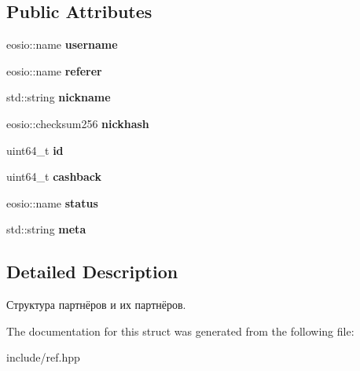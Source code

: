 \subsection*{Public Attributes}
\begin{DoxyCompactItemize}
\item 
\mbox{\label{structpartners2_a7b279bce1d671ae29aa0d9b14936204b}} 
eosio\+::name {\bfseries username}
\item 
\mbox{\label{structpartners2_a6198ca816832f4fcb8b6211c9e88f7b1}} 
eosio\+::name {\bfseries referer}
\item 
\mbox{\label{structpartners2_adb751d90a64a4b19f0aab7e61f792f25}} 
std\+::string {\bfseries nickname}
\item 
\mbox{\label{structpartners2_aadb1fde1e890fa68678cba34acb50b82}} 
eosio\+::checksum256 {\bfseries nickhash}
\item 
\mbox{\label{structpartners2_a8902d55d8abeecef589daabb3c0e85e5}} 
uint64\+\_\+t {\bfseries id}
\item 
\mbox{\label{structpartners2_af916875cf91b9cd8534f0cbe84317a6c}} 
uint64\+\_\+t {\bfseries cashback}
\item 
\mbox{\label{structpartners2_aa9d5cb6acaacac876169c5f3efddcf1e}} 
eosio\+::name {\bfseries status}
\item 
\mbox{\label{structpartners2_a8189bf00e09ffc820b76f99acd7b337a}} 
std\+::string {\bfseries meta}
\end{DoxyCompactItemize}


\subsection{Detailed Description}
Структура партнёров и их партнёров. 

The documentation for this struct was generated from the following file\+:\begin{DoxyCompactItemize}
\item 
include/ref.\+hpp\end{DoxyCompactItemize}
